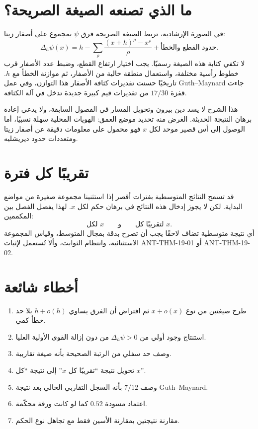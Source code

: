 \section{ما الذي تصنعه الصيغة الصريحة؟}

في الصورة الإرشادية، تربط الصيغة الصريحة فرق \(\psi\) بمجموع على أصفار زيتا:
\[
\Delta_h\psi(x)
=
h-
\sum_\rho
\frac{(x+h)^\rho-x^\rho}{\rho}
+\text{حدود القطع والخطأ}.
\]
لا تكفي كتابة هذه الصيغة رسميًا. يجب اختيار ارتفاع القطع، وضبط عدد الأصفار قرب خطوط رأسية مختلفة، واستعمال منطقة خالية من الأصفار، ثم موازنة الخطأ مع \(h\). تاريخيًا حسنت تقديرات كثافة الأصفار هذا التوازن، وفي عمل Guth--Maynard جاءت قفزة \(17/30\) من تقديرات قيم كبيرة جديدة تدخل في آلة الكثافة.

هذا الشرح لا يسد دين بيرون وتحويل المسار في الفصول السابقة، ولا يدعي إعادة برهان النتيجة الحديثة. الغرض منه تحديد موضع العمق: الهويات المحلية سهلة نسبيًا، أما الوصول إلى أس قصير موحد لكل \(x\) فهو محمول على معلومات دقيقة عن أصفار زيتا ومتعددات حدود ديريشليه.

\section{تقريبًا كل فترة}

قد تسمح النتائج المتوسطية بفترات أقصر إذا استثنينا مجموعة صغيرة من مواضع البداية. لكن لا يجوز إدخال هذه النتائج في برهان حكم لكل \(x\). لهذا يفصل الفصل بين المكممين:
\[
\text{لكل \(x\)}
\qquad\text{و}\qquad
\text{لتقريبًا كل \(x\)}.
\]
أي نتيجة متوسطية تضاف لاحقًا يجب أن تصرح بدقة بمجال المتوسط، وقياس المجموعة الاستثنائية، وانتظام الثوابت، وألا تُستعمل لإثبات \textenglish{ANT-THM-19-01} أو \textenglish{ANT-THM-19-02}.

\section{أخطاء شائعة}

\begin{enumerate}
  \item طرح صيغتين من نوع \(x+o(x)\) ثم افتراض أن الفرق يساوي \(h+o(h)\) بلا حد خطأ كمي.
  \item استنتاج وجود أولي من \(\Delta_h\psi>0\) من دون إزالة القوى الأولية العليا.
  \item وصف حد سفلي من الرتبة الصحيحة بأنه صيغة تقاربية.
  \item تحويل نتيجة ``تقريبًا كل \(x\)'' إلى نتيجة ``كل \(x\)''.
  \item وصف \(7/12\) بأنه السجل التقاربي الحالي بعد نتيجة Guth--Maynard.
  \item اعتماد مسودة \(0.52\) كما لو كانت ورقة محكّمة.
  \item مقارنة نتيجتين بمقارنة الأسين فقط مع تجاهل نوع الحكم.
\end{enumerate}


